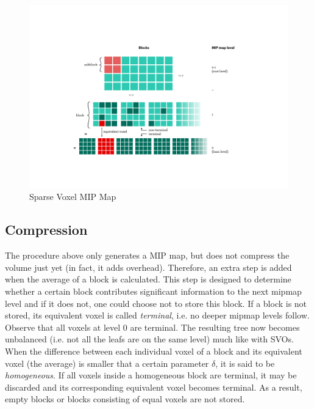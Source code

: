 \begin{figure}[b!]
\begin{center}
\includegraphics[scale=0.65]{figures/datastructure.pdf} 
\caption{Sparse Voxel MIP Map }
\label{fig:svmm}
\end{center}
\end{figure}

\subsection{Compression} \label{sec:compression}

The procedure above only generates a MIP map, but does not compress the volume just yet (in fact, it adds overhead). Therefore, an extra step is added when the average of a block is calculated.
This step is designed to determine whether a certain block contributes significant information to the next mipmap level and if it does not, one could choose not to store this block. If a block is not stored, its equivalent voxel is called \emph{terminal}, i.e. no deeper mipmap levels follow. Observe that all voxels at level 0 are terminal. The resulting tree now becomes unbalanced (i.e. not all the leafs are on the same level) much like with SVOs.
When the difference between each individual voxel of a block and its equivalent voxel (the average) is smaller that a certain parameter $\delta$, it is said to be \emph{homogeneous}. If all voxels inside a homogeneous block are terminal, it may be discarded and its corresponding equivalent voxel becomes terminal. As a result, empty blocks or blocks consisting of equal voxels are not stored. 

